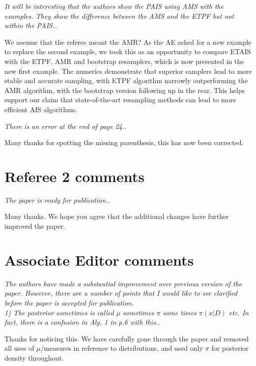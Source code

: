 \documentclass{article}
\newcommand{\comment}[2]{\vspace{0.6cm}{\bf Comment:} {\it #1.}

\vspace{0.3cm}{\bf Answer:} #2}
\begin{document}
\comment{It will be interesting that the authors show the PAIS using AMS with the examples. They show the difference between the AMS and the ETPF but not within the PAIS.}{We assume that the referee meant the AMR? As the AE asked for a new example to replace the second example, we took this as an opportunity to compare ETAIS with the ETPF, AMR and bootstrap resamplers, which is now presented in the new first example. The numerics demonstrate that superior samplers lead to more stable and accurate sampling, with ETPF algorithm narrowly outperforming the AMR algorithm, with the bootstrap version following up in the rear. This helps support our claim that state-of-the-art resampling methods can lead to more efficient AIS algorithms.}

\comment{There is an error at the end of page 24.}{Many thanks for spotting the missing parenthesis, this has now been corrected.}

\section*{Referee 2 comments}
\comment{The paper is ready for publication.}{Many thanks. We hope you agree that the additional changes have further improved the paper.}

\section*{Associate Editor comments}

\comment{The authors have made a substantial improvement over previous version of the paper. However, there are a number of points that I would like to see clarified before the paper is accepted for publication.\\
1) The posterior sometimes is called $\mu$ sometimes $\pi$ some times $\pi(x|D)$ etc. In fact, there is a confusion in Alg. 1 in p.6 with this.}{Thanks for noticing this. We have carefully gone through the paper and removed all uses of $\mu$/measures in reference to distributions, and used only $\pi$ for posterior density throughout.}
\end{document}
